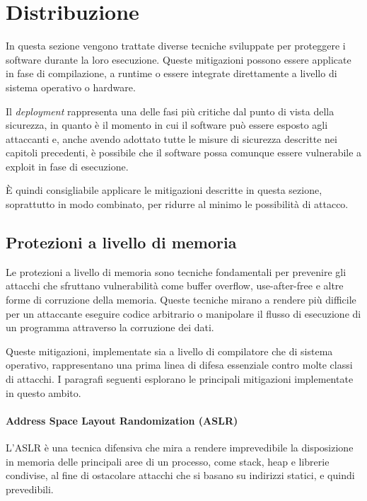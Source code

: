 \section{Distribuzione}
\label{sec:deployment}

In questa sezione vengono trattate diverse tecniche sviluppate per proteggere i software
durante la loro esecuzione. Queste mitigazioni possono essere applicate in fase
di compilazione, a runtime o essere integrate direttamente a livello di sistema operativo
o hardware.

Il \textit{deployment} rappresenta una delle fasi più critiche dal punto di
vista della sicurezza, in quanto è il momento in cui il software può essere esposto
agli attaccanti e, anche avendo adottato tutte le misure di sicurezza descritte
nei capitoli precedenti, è possibile che il software possa comunque essere vulnerabile
a exploit in fase di esecuzione.

È quindi consigliabile applicare le mitigazioni descritte in questa sezione,
soprattutto in modo combinato, per ridurre al minimo le possibilità di attacco.

\subsection{Protezioni a livello di memoria}
\label{sec:memory-protection}

Le protezioni a livello di memoria sono tecniche fondamentali per prevenire gli
attacchi che sfruttano vulnerabilità come buffer overflow, use-after-free e altre
forme di corruzione della memoria. Queste tecniche mirano a rendere più
difficile per un attaccante eseguire codice arbitrario o manipolare il flusso di
esecuzione di un programma attraverso la corruzione dei dati.

Queste mitigazioni, implementate sia a livello di compilatore che di sistema operativo,
rappresentano una prima linea di difesa essenziale contro molte classi di
attacchi. I paragrafi seguenti esplorano le principali mitigazioni implementate in
questo ambito.

\paragraph{Address Space Layout Randomization (ASLR)}
L'ASLR è una tecnica difensiva che mira a rendere imprevedibile la disposizione
in memoria delle principali aree di un processo, come stack, heap e librerie
condivise, al fine di ostacolare attacchi che si basano su indirizzi statici, e
quindi prevedibili.

